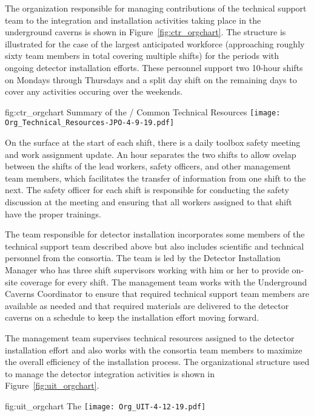 The organization responsible for managing contributions of 
the technical support team to the integration and installation 
activities taking place in the underground caverns is shown 
in Figure~\ref{fig:ctr_orgchart}.  The structure is illustrated
for the case of the largest anticipated workforce (approaching 
roughly sixty team members in total covering multiple shifts) 
for the periods with ongoing detector installation efforts.
These personnel support two 10-hour shifts on Mondays through 
Thursdays and a split day shift on the remaining days to cover 
any activities occuring over the weekends. 
\begin{dunefigure}{fig:ctr_orgchart}
  {Summary of the / Common Technical Resources}
  \texttt{[image: Org\_Technical\_Resources-JPO-4-9-19.pdf]}
\end{dunefigure}

On the surface at the start of each shift, there is a daily 
toolbox safety meeting and work assignment update. An hour 
separates the two shifts to allow ovelap between the shifts 
of the lead workers, safety officers, and other management 
team members, which facilitates the transfer of information 
from one shift to the next. The safety officer for each shift 
is responsible for conducting the safety discussion at the 
meeting and ensuring that all workers assigned to that shift 
have the proper trainings.

The team responsible for detector installation incorporates 
some members of the technical support team described above 
but also includes scientific and technical personnel from 
the  consortia.  The team is led by the Detector 
Installation Manager who has three shift supervisors working 
with him or her to provide on-site coverage for every shift.
The management team works with the Underground Caverns 
Coordinator to ensure that required technical support team 
members are available as needed and that required materials 
are delivered to the detector caverns on a schedule to keep
the installation effort moving forward.         

The management team supervises technical resources assigned to 
the detector installation effort and also works with the consortia 
team members to maximize the overall efficiency of the installation 
process.  The organizational structure used to manage the detector 
integration activities is shown in Figure~\ref{fig:uit_orgchart}.

\begin{dunefigure}{fig:uit_orgchart}
  {The }
  \texttt{[image: Org\_UIT-4-12-19.pdf]}
\end{dunefigure}

